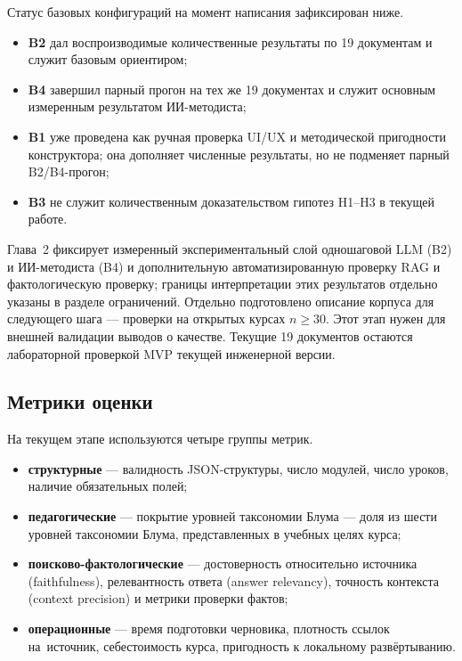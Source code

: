 Статус базовых конфигураций на момент написания зафиксирован ниже.

\begin{itemize}
  \item \textbf{B2} дал воспроизводимые количественные результаты
    по 19 документам и служит базовым ориентиром;
  \item \textbf{B4} завершил парный прогон на тех же 19 документах
    и служит основным измеренным результатом ИИ-методиста;
  \item \textbf{B1} уже проведена как ручная проверка UI/UX и
    методической пригодности конструктора; она дополняет численные
    результаты, но не подменяет парный B2/B4-прогон;
  \item \textbf{B3} не служит количественным доказательством гипотез
    H1–H3 в текущей работе.
\end{itemize}

Глава~2 фиксирует измеренный экспериментальный слой одношаговой LLM (B2)
и ИИ-методиста (B4) и
дополнительную автоматизированную проверку RAG и фактологическую проверку; границы
интерпретации этих результатов отдельно указаны в разделе ограничений.
Отдельно подготовлено описание корпуса для следующего шага — проверки
на открытых курсах $n \geq 30$. Этот этап нужен для внешней
валидации выводов о качестве. Текущие 19 документов остаются
лабораторной проверкой MVP текущей инженерной версии.

\subsection{Метрики оценки}

На текущем этапе используются четыре группы метрик.

\begin{itemize}
  \item \textbf{структурные} — валидность JSON-структуры, число модулей,
    число уроков, наличие обязательных полей;
  \item \textbf{педагогические} — покрытие уровней таксономии Блума — доля из шести
    уровней таксономии Блума, представленных в учебных целях курса;
  \item \textbf{поисково-фактологические} — достоверность относительно
    источника (faithfulness), релевантность ответа (answer relevancy),
    точность контекста (context precision) и метрики проверки фактов;
  \item \textbf{операционные} — время подготовки черновика, плотность ссылок на~источник,
    себестоимость курса, пригодность к локальному развёртыванию.
\end{itemize}

